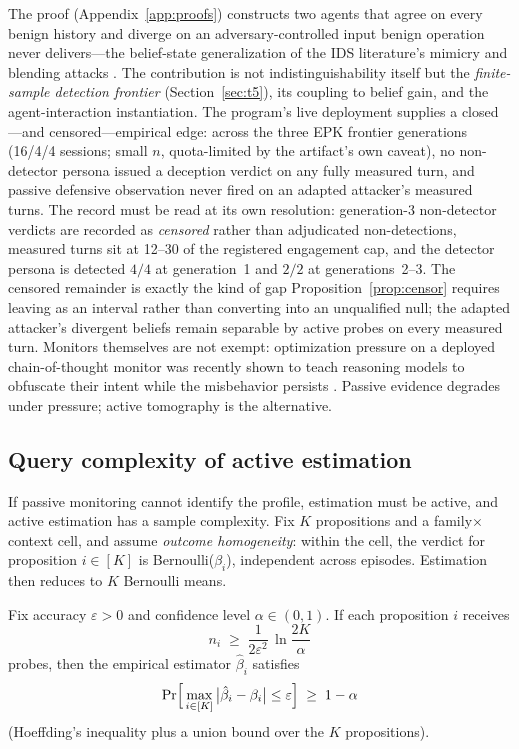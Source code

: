 The proof (Appendix~\ref{app:proofs}) constructs two agents that agree on
every benign history and diverge on an adversary-controlled input benign
operation never delivers---the belief-state generalization of the IDS
literature's mimicry and blending attacks
\cite{wagner2002,fogla2006}. The contribution is not indistinguishability
itself but the \emph{finite-sample detection frontier}
(Section~\ref{sec:t5}), its coupling to belief gain, and the
agent-interaction instantiation. The program's
live deployment supplies a closed---and censored---empirical edge: across the
three EPK frontier generations (16/4/4 sessions; small $n$,
quota-limited by the artifact's own caveat), no non-detector persona issued
a deception verdict on any fully measured turn, and passive defensive
observation never fired on an adapted attacker's measured turns. The
record must be read at its own resolution: generation-3 non-detector
verdicts are recorded as \emph{censored} rather than adjudicated
non-detections, measured turns sit at 12--30 of the registered engagement
cap, and the detector persona is detected $4/4$ at generation~1 and $2/2$ at
generations~2--3. The
censored remainder is exactly the kind of gap Proposition~\ref{prop:censor}
requires leaving as an interval rather than converting into an unqualified
null; the adapted attacker's divergent beliefs remain separable by active
probes on every measured turn. Monitors themselves are not
exempt: optimization pressure on a deployed chain-of-thought monitor was
recently shown to teach reasoning models to obfuscate their intent while the
misbehavior persists \cite{baker2025monitoring}. Passive evidence degrades
under pressure; active tomography is the alternative.

\subsection{Query complexity of active estimation}\label{sec:qc}

If passive monitoring cannot identify the profile, estimation must be
active, and active estimation has a sample complexity. Fix $K$ propositions
and a family$\times$context cell, and assume \emph{outcome homogeneity}:
within the cell, the verdict for proposition $i\in[K]$ is Bernoulli($\beta_i$),
independent across episodes. Estimation then reduces to $K$ Bernoulli means.

\begin{theorem}\label{thm:uniform}
Fix accuracy $\varepsilon>0$ and confidence level $\alpha\in(0,1)$. If each
proposition $i$ receives
\[
n_i \;\ge\; \frac{1}{2\varepsilon^{2}}\,\ln\frac{2K}{\alpha}
\]
probes, then the empirical estimator $\hat\beta_i$ satisfies
\[
\Pr\Bigl[\,\max_{i\in[K]}\,\bigl|\hat\beta_i-\beta_i\bigr|\le\varepsilon
\Bigr]\;\ge\;1-\alpha
\]
(Hoeffding's inequality \cite{hoeffding1963} plus a union bound over the $K$
propositions).
\end{theorem}

